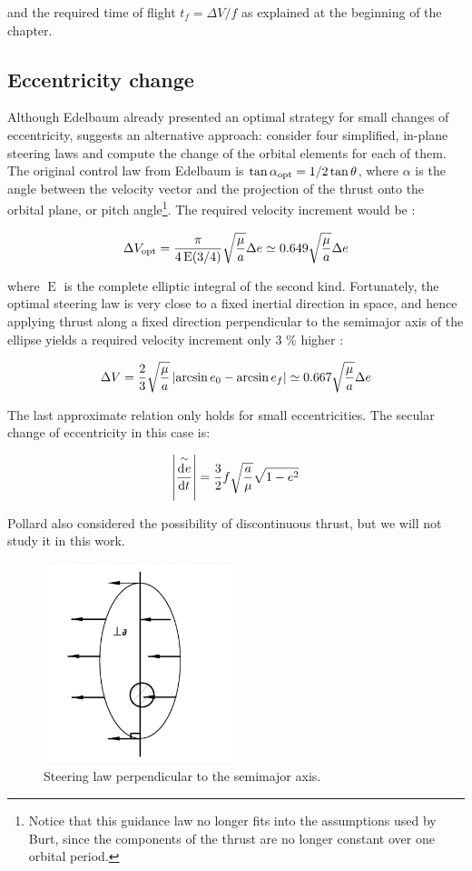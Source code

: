 and the required time of flight $t_f = \Delta V / f$ as explained at the beginning of the chapter.

\subsection{Eccentricity change} \label{sec:metecc}

Although Edelbaum already presented an optimal strategy for small changes of eccentricity, \cite{pollard1997simplified} suggests an alternative approach: consider four simplified, in-plane steering laws and compute the change of the orbital elements for each of them. The original control law from Edelbaum is $\tan{\alpha_{\text{opt}} = 1/2} \tan{\ensuremath{\theta}}$, where $\alpha$ is the angle between the velocity vector and the projection of the thrust onto the orbital plane, or pitch angle\footnote{Notice that this guidance law no longer fits into the assumptions used by Burt, since the components of the thrust are no longer constant over one orbital period.}. The required velocity increment would be \cite{edelbaum1961propulsion}:

\[
\Delta V_{\text{opt}} = \frac{\pi}{4 \operatorname{E} (3/4)} \sqrt{\frac{\mu}{a}} \Delta e \simeq 0.649 \sqrt{\frac{\mu}{a}} \Delta e
\]

where $\operatorname{E}$ is the complete elliptic integral of the second kind. Fortunately, the optimal steering law is very close to a fixed inertial direction in space, and hence applying thrust along a fixed direction perpendicular to the semimajor axis of the ellipse yields a required velocity increment only 3 \% higher \cite{pollard1997simplified}:

\[
\Delta V = \frac{2}{3} \sqrt{\frac{\mu}{a}} \left| \arcsin{e_0} - \arcsin{e_f} \right| \simeq 0.667 \sqrt{\frac{\mu}{a}} \Delta e
\]

The last approximate relation only holds for small eccentricities. The secular change of eccentricity in this case is:

\[
\left| \overset{\sim}{\frac{\operatorname{d}\!^{} e}{\operatorname{d}\! t^{}}} \right| = \frac{3}{2} f \sqrt{\frac{a}{\mu}} \sqrt{1 - e^2}
\]

Pollard also considered the possibility of discontinuous thrust, but we will not study it in this work.

\begin{figure}%
  \centering
  \includegraphics[width=0.5\textwidth]{figures/fixed-perpendicular.png}
  \caption{Steering law perpendicular to the semimajor axis.}
  \label{fig:perpendicular}
\end{figure}

